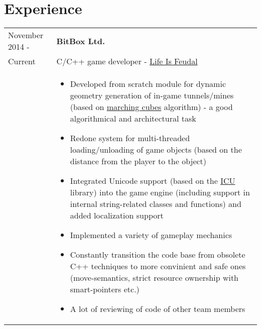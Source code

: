 \documentclass[a4paper, 11pt]{article}
\begin{document}
\section{Experience}
\begin{longtable}{p{25mm}|p{110mm}}
    November 2014 -     & \textbf{BitBox Ltd.}                                                        \\
    Current             & C/C++ game developer - \href{http://lifeisfeudal.com/mmo}{Life Is Feudal}   \\
                        &
    \begin{itemize}
        \item   Developed from scratch module for dynamic geometry generation
                of in-game tunnels/mines (based on
                \href{https://ru.wikipedia.org/wiki/Marching_cubes}{marching cubes}
                algorithm) - a good algorithmical and architectural task
        \item   Redone system for multi-threaded loading/unloading of game
                objects (based on the distance from the player to the object)
        \item   Integrated Unicode support (based on the \href{http://site.icu-project.org/}{ICU}
                library) into the game engine (including support in internal
                string-related classes and functions) and added localization
                support
        \item   Implemented a variety of gameplay mechanics
        \item   Constantly transition the code base from obsolete C++ techniques
                to more convinient and safe ones (move-semantics, strict resource
                ownership with smart-pointers etc.)
        \item   A lot of reviewing of code of other team members
    \end{itemize}                                                                   \\


\end{longtable}
\end{document}
